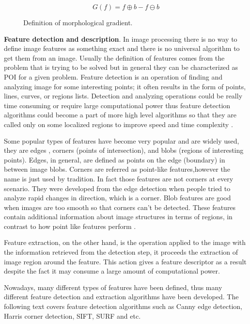 \documentclass[../../../../main]{subfiles}
\begin{document}
\begin{figure} [!ht]
  \centering    
    \begin{equation}
        G(f) = f \oplus b - f \ominus b
    \end{equation}
    \label{fig:morphological_gradient}
  \caption{Definition of morphological gradient.}
\end{figure}

\textbf{Feature detection and description}. In image processing there is no way to define image features as something exact and there is no universal algorithm to get them from an image. Usually the definition of features comes from the problem that is trying to be solved but in general they can be characterized as \ac{POI} for a given problem. 
Feature detection is an operation of finding and analyzing image for some interesting points; it often results in the form of points, lines, curves, or regions lists. Detection and analyzing operations could be really time consuming or require large computational power thus feature detection algorithms could become a part of more high level algorithms so that they are called only on some localized regions to improve speed and time complexity \cite{opencv_docs_understanding_features}. 

Some popular types of features have become very popular and are widely used, they are edges \cite{cv_basics_3_linda_shapiro}, corners (points of intersection), and blobs (regions of interesting points).
Edges, in general, are defined as points on the edge (boundary) in between image blobs. Corners are referred as point-like features,however the name is just used by tradition. In fact those features are not corners at every scenario. They were developed from the edge detection when people tried to analyze rapid changes in direction, which is a corner. Blob features are good when images are too smooth so that corners can't be detected. These features contain additional information about image structures in terms of regions, in contrast to how point like features perform \cite{feature_matching_presentation}.

Feature extraction, on the other hand, is the operation applied to the image with the information retrieved from the detection step, it proceeds the extraction of image region around the feature. This action gives a feature descriptor as a result despite the fact it may consume a large amount of computational power.

Nowadays, many different types of features have been defined, thus many different feature detection and extraction algorithms have been developed. The following text covers feature detection algorithms such as Canny edge detection, Harris corner detection, \ac{SIFT}, \ac{SURF} and etc.
\end{document}
